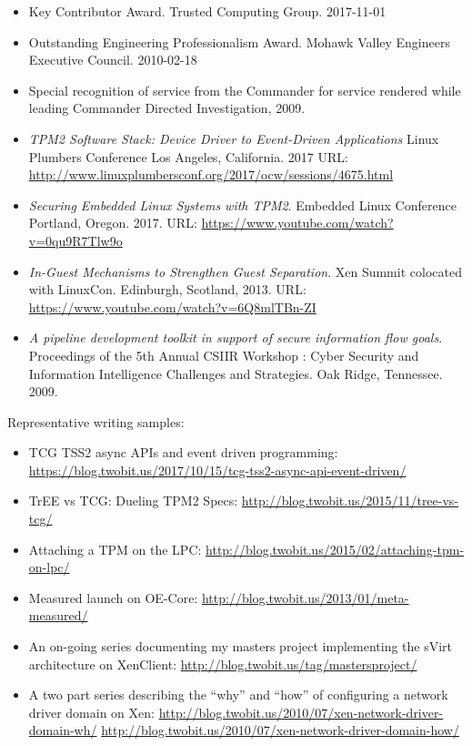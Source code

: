 \documentclass[letterpaper,11pt]{article}
\begin{document}
    \begin {itemize}
      \setlength {\itemsep}{1pt}
      \setlength {\parskip}{0pt}
      \setlength {\parsep}{0pt}
    \item Key Contributor Award.
      Trusted Computing Group.
      2017-11-01
    \item Outstanding Engineering Professionalism Award.
      Mohawk Valley Engineers Executive Council.
      2010-02-18
    \item Special recognition of service from the Commander for service rendered while leading Commander Directed Investigation, 2009.
    \end {itemize}

    \begin{itemize}
    \item {\it TPM2 Software Stack: Device Driver to Event-Driven Applications}
    Linux Plumbers Conference
    Los Angeles, California.
    2017
    URL: \url {http://www.linuxplumbersconf.org/2017/ocw/sessions/4675.html}
    \item {\it Securing Embedded Linux Systems with TPM2}.
    Embedded Linux Conference
    Portland, Oregon.
    2017.
    URL: \url {https://www.youtube.com/watch?v=0qu9R7Tlw9o}
    \item {\it In-Guest Mechanisms to Strengthen Guest Separation}.
    Xen Summit colocated with LinuxCon.
    Edinburgh, Scotland,
    2013.
    URL: \url {https://www.youtube.com/watch?v=6Q8mlTBn-ZI}
    \item {\it A pipeline development toolkit in support of secure information flow goals}.
    Proceedings of the 5th Annual CSIIR Workshop : Cyber Security and Information Intelligence Challenges and Strategies.
    Oak Ridge, Tennessee.
    2009.
    \end{itemize}
    Representative writing samples:
    \begin {itemize}
      \setlength {\itemsep}{1pt}
      \setlength {\parskip}{0pt}
      \setlength {\parsep}{0pt}
    \item
      TCG TSS2 async APIs and event driven programming:
      \url {https://blog.twobit.us/2017/10/15/tcg-tss2-async-api-event-driven/}
    \item
      TrEE vs TCG: Dueling TPM2 Specs:
      \url {http://blog.twobit.us/2015/11/tree-vs-tcg/}
    \item
      Attaching a TPM on the LPC:
      \url {http://blog.twobit.us/2015/02/attaching-tpm-on-lpc/}
    \item
      Measured launch on OE-Core:
      \url {http://blog.twobit.us/2013/01/meta-measured/}
    \item
      An on-going series documenting my masters project implementing the sVirt architecture on XenClient:
      \url {http://blog.twobit.us/tag/mastersproject/}
    \item
      A two part series describing the ``why'' and ``how'' of configuring a network driver domain on Xen:
      \url {http://blog.twobit.us/2010/07/xen-network-driver-domain-wh/}
      \url {http://blog.twobit.us/2010/07/xen-network-driver-domain-how/}
    \end {itemize}
\end{document}
